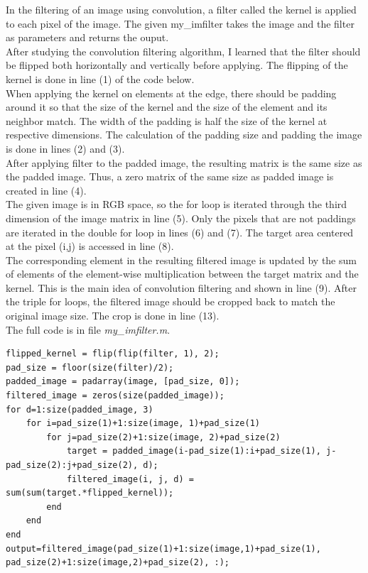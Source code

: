 In the filtering of an image using convolution, a filter called the kernel is applied to each pixel of the image. The given my\_imfilter takes the image and the filter as parameters and returns the ouput. \\
After studying the convolution filtering algorithm, I learned that the filter should be flipped both horizontally and vertically before applying. The flipping of the kernel is done in line (1) of the code below. \\
When applying the kernel on elements at the edge, there should be padding around it so that the size of the kernel and the size of the element and its neighbor match. The width of the padding is half the size of the kernel at respective dimensions. The calculation of the padding size and padding the image is done in lines (2) and (3). \\
After applying filter to the padded image, the resulting matrix is the same size as the padded image. Thus, a zero matrix of the same size as padded image is created in line (4).\\
The given image is in RGB space, so the for loop is iterated through the third dimension of the image matrix in line (5).
Only the pixels that are not paddings are iterated in the double for loop in lines (6) and (7). 
The target area centered at the pixel (i,j) is accessed in line (8).\\
The corresponding element in the resulting filtered image is updated by the sum of elements of the element-wise multiplication between the target matrix and the kernel. This is the main idea of convolution filtering and shown in line (9).
After the triple for loops, the filtered image should be cropped back to match the original image size. The crop is done in line (13).
\\The full code is in file \emph{my\_imfilter.m}.

\begin{lstlisting}[style=Matlab-editor]
flipped_kernel = flip(flip(filter, 1), 2);
pad_size = floor(size(filter)/2);
padded_image = padarray(image, [pad_size, 0]);
filtered_image = zeros(size(padded_image));
for d=1:size(padded_image, 3)
    for i=pad_size(1)+1:size(image, 1)+pad_size(1)
        for j=pad_size(2)+1:size(image, 2)+pad_size(2)
            target = padded_image(i-pad_size(1):i+pad_size(1), j-pad_size(2):j+pad_size(2), d);
            filtered_image(i, j, d) = sum(sum(target.*flipped_kernel));
        end
    end
end
output=filtered_image(pad_size(1)+1:size(image,1)+pad_size(1), pad_size(2)+1:size(image,2)+pad_size(2), :);

\end{lstlisting}

